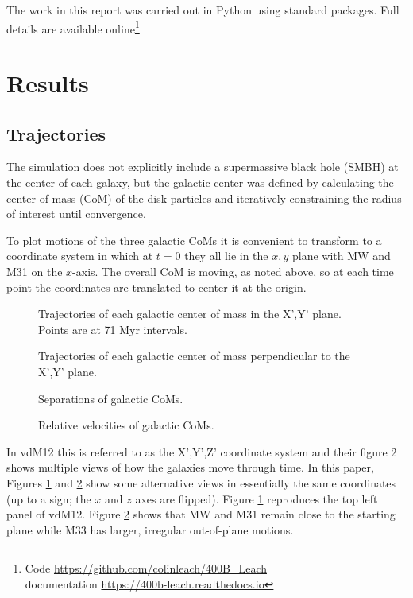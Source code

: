 \documentclass[twocolumn]{aastex63}
\begin{document}
The work in this report was carried out in Python using standard packages. Full details are available online\footnote{Code \url{https://github.com/colinleach/400B_Leach}\\documentation \url{https://400b-leach.readthedocs.io}}

\section{Results}

\subsection{Trajectories}

The simulation does not explicitly include a supermassive black hole (SMBH) at the center of each galaxy, but the galactic center was defined by calculating the center of mass (CoM) of the disk particles and iteratively constraining the radius of interest until convergence.

To plot motions of the three galactic CoMs it is convenient to transform to a coordinate system in which at $t=0$ they all lie in the $x,y$ plane with MW and M31 on the $x$-axis. The overall CoM is moving, as noted above, so at each time point the coordinates are translated to center it at the origin.

\begin{figure}[htb!]
	\caption{Trajectories of each galactic center of mass in the X',Y' plane. Points are at 71 Myr intervals.
		\label{fig:traj_xy}}
\end{figure}

\begin{figure}[htb!]
	\caption{Trajectories of each galactic center of mass perpendicular to the X',Y' plane.
		\label{fig:traj_z}}
\end{figure}

\begin{figure}[hbt!]
	\caption{Separations of galactic CoMs.
		\label{fig:rel_sep}}
\end{figure}

\begin{figure}[hbt!]
	\caption{Relative velocities of galactic CoMs.
		\label{fig:rel_vel}}
\end{figure}

In vdM12 this is referred to as the X',Y',Z' coordinate system and their figure 2 shows multiple views of how the galaxies move through time. In this paper, Figures \ref{fig:traj_xy} and  \ref{fig:traj_z} show some alternative views in essentially the same coordinates (up to a sign; the $x$ and $z$ axes are flipped). Figure \ref{fig:traj_xy} reproduces the top left panel of vdM12. Figure \ref{fig:traj_z} shows that MW and M31 remain close to the starting plane while M33 has larger, irregular out-of-plane motions.
\end{document}

